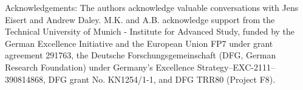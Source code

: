 \vspace{3mm}
\footnotesize
Acknowledgements:  The authors acknowledge valuable conversations with Jens Eisert and Andrew Daley.
M.K. and A.B. acknowledge support from the Technical University of Munich - Institute for Advanced Study, funded by the German Excellence Initiative and the European Union FP7 under grant agreement 291763, the Deutsche Forschungsgemeinschaft (DFG, German Research Foundation) under Germany's Excellence Strategy--EXC-2111--390814868, DFG grant No. KN1254/1-1, and DFG TRR80 (Project F8).

